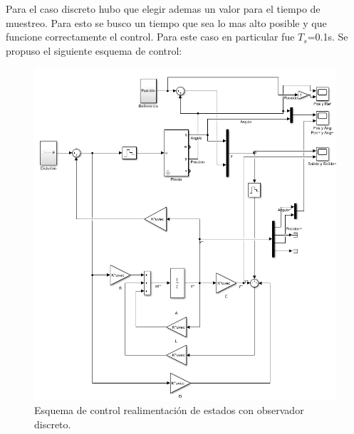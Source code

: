 Para el caso discreto hubo que elegir ademas un valor para el tiempo de muestreo. Para esto se busco un tiempo que sea lo mas alto posible y que funcione correctamente el control. Para este caso en particular fue $T_s$=0.1s.
Se propuso el siguiente esquema de control:
\begin{figure}[H]
	\centering
	\includegraphics[width=1\linewidth]{Imagenes/Esquema_general_obs_disc.png}
	\caption{Esquema de control realimentación de estados con observador discreto.}
	\label{esqdisctobs}
\end{figure}

